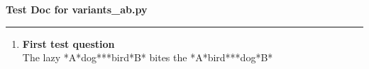 \documentclass [ngerman,12pt]{paper}
\begin{document}
\begin{center}
{\large\bf Test Doc for variants\_ab.py}\\[2mm]

\end{center}
\hrule
\medskip

\begin{enumerate}

\item \textbf{First test question}\\
The lazy *A*dog***bird*B* bites the *A*bird***dog*B*

\end{enumerate}
\end{document}
